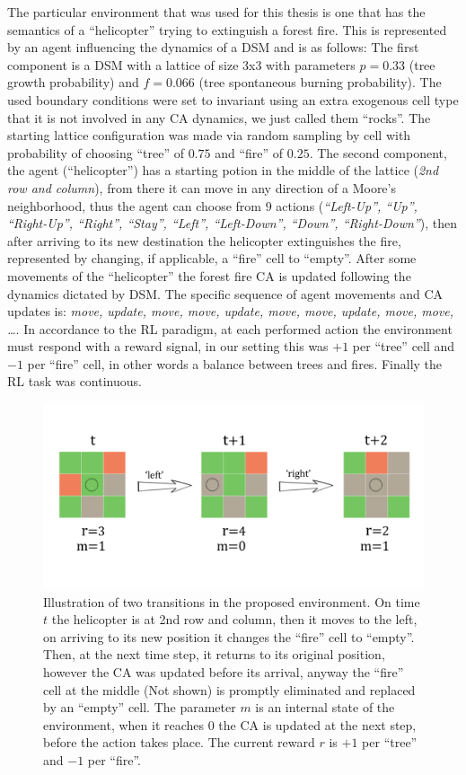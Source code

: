 \documentclass[
]{book}
\begin{document}
The particular environment that was used for this thesis is one that has the semantics of a ``helicopter'' trying to extinguish a forest fire. This is represented by an agent influencing the dynamics of a DSM and is as follows: The first component is a DSM with a lattice of size 3x3 with parameters \(p=0.33\) (tree growth probability) and \(f=0.066\) (tree spontaneous burning probability). The used boundary conditions were set to invariant using an extra exogenous cell type that it is not involved in any CA dynamics, we just called them ``rocks''. The starting lattice configuration was made via random sampling by cell with probability of choosing ``tree'' of \(0.75\) and ``fire'' of \(0.25\). The second component, the agent (``helicopter'') has a starting potion in the middle of the lattice (\emph{2nd row and column}), from there it can move in any direction of a Moore's neighborhood, thus the agent can choose from \(9\) actions (\emph{``Left-Up'', ``Up'', ``Right-Up'', ``Right'', ``Stay'', ``Left'', ``Left-Down'', ``Down'', ``Right-Down''}), then after arriving to its new destination the helicopter extinguishes the fire, represented by changing, if applicable, a ``fire'' cell to ``empty''. After some movements of the ``helicopter'' the forest fire CA is updated following the dynamics dictated by DSM. The specific sequence of agent movements and CA updates is: \emph{move, update, move, move, update, move, move, update, move, move, \ldots{}}. In accordance to the RL paradigm, at each performed action the environment must respond with a reward signal, in our setting this was \(+1\) per ``tree'' cell and \(-1\) per ``fire'' cell, in other words a balance between trees and fires. Finally the RL task was continuous.



\begin{figure}

{\centering \includegraphics[width=0.8\linewidth]{pics/agent-env_3x3} 

}

\caption{Illustration of two transitions in the proposed environment. On time \(t\) the helicopter is at 2nd row and column, then it moves to the left, on arriving to its new position it changes the ``fire'' cell to ``empty''. Then, at the next time step, it returns to its original position, however the CA was updated before its arrival, anyway the ``fire'' cell at the middle (Not shown) is promptly eliminated and replaced by an ``empty'' cell. The parameter \(m\) is an internal state of the environment, when it reaches \(0\) the CA is updated at the next step, before the action takes place. The current reward \(r\) is \(+1\) per ``tree'' and \(-1\) per ``fire''.}\label{fig:thesis-3-3-env}
\end{figure}
\end{document}
